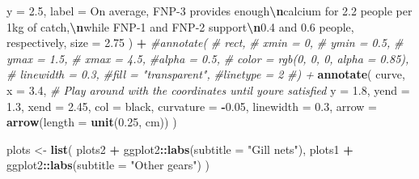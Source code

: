\documentclass[
]{book}
\newenvironment{Shaded}{\begin{snugshade}}{\end{snugshade}}
\newcommand{\AttributeTok}[1]{\textcolor[rgb]{0.13,0.29,0.53}{#1}}
\newcommand{\CommentTok}[1]{\textcolor[rgb]{0.56,0.35,0.01}{\textit{#1}}}
\newcommand{\FloatTok}[1]{\textcolor[rgb]{0.00,0.00,0.81}{#1}}
\newcommand{\FunctionTok}[1]{\textcolor[rgb]{0.13,0.29,0.53}{\textbf{#1}}}
\newcommand{\NormalTok}[1]{#1}
\newcommand{\OtherTok}[1]{\textcolor[rgb]{0.56,0.35,0.01}{#1}}
\newcommand{\SpecialCharTok}[1]{\textcolor[rgb]{0.81,0.36,0.00}{\textbf{#1}}}
\newcommand{\StringTok}[1]{\textcolor[rgb]{0.31,0.60,0.02}{#1}}
\begin{document}
\begin{Shaded}
\begin{Highlighting}[]
    \AttributeTok{y =} \FloatTok{2.5}\NormalTok{,}
    \AttributeTok{label =} \StringTok{\textquotesingle{}On average, FNP{-}3 provides enough}\SpecialCharTok{\textbackslash{}n}\StringTok{calcium for 2.2 people per 1kg of catch,}\SpecialCharTok{\textbackslash{}n}\StringTok{while FNP{-}1 and FNP{-}2 support}\SpecialCharTok{\textbackslash{}n}\StringTok{0.4 and 0.6 people, respectively\textquotesingle{}}\NormalTok{,}
    \AttributeTok{size =} \FloatTok{2.75}
\NormalTok{  ) }\SpecialCharTok{+}
  \CommentTok{\#annotate(}
  \CommentTok{\#  \textquotesingle{}rect\textquotesingle{},}
  \CommentTok{\#  xmin = 0,}
  \CommentTok{\#  ymin = 0.5,}
  \CommentTok{\#  ymax = 1.5,}
  \CommentTok{\#  xmax = 4.5,}
    \CommentTok{\#alpha = 0.5,}
  \CommentTok{\#  color = rgb(0, 0, 0, alpha = 0.85),}
   \CommentTok{\# linewidth = 0.3,}
    \CommentTok{\#fill = "transparent",}
    \CommentTok{\#linetype = 2}
  \CommentTok{\#) +}
  \FunctionTok{annotate}\NormalTok{(}
    \StringTok{\textquotesingle{}curve\textquotesingle{}}\NormalTok{,}
    \AttributeTok{x =} \FloatTok{3.4}\NormalTok{, }\CommentTok{\# Play around with the coordinates until you\textquotesingle{}re satisfied}
    \AttributeTok{y =} \FloatTok{1.8}\NormalTok{,}
    \AttributeTok{yend =} \FloatTok{1.3}\NormalTok{,}
    \AttributeTok{xend =} \FloatTok{2.45}\NormalTok{,}
    \AttributeTok{col =} \StringTok{\textquotesingle{}black\textquotesingle{}}\NormalTok{,}
    \AttributeTok{curvature =} \SpecialCharTok{{-}}\FloatTok{0.05}\NormalTok{,}
    \AttributeTok{linewidth =} \FloatTok{0.3}\NormalTok{,}
    \AttributeTok{arrow =} \FunctionTok{arrow}\NormalTok{(}\AttributeTok{length =} \FunctionTok{unit}\NormalTok{(}\FloatTok{0.25}\NormalTok{, }\StringTok{\textquotesingle{}cm\textquotesingle{}}\NormalTok{))}
\NormalTok{  )}


\NormalTok{plots }\OtherTok{\textless{}{-}}
  \FunctionTok{list}\NormalTok{(}
\NormalTok{    plots2 }\SpecialCharTok{+}\NormalTok{ ggplot2}\SpecialCharTok{::}\FunctionTok{labs}\NormalTok{(}\AttributeTok{subtitle =} \StringTok{"Gill nets"}\NormalTok{),}
\NormalTok{    plots1 }\SpecialCharTok{+}\NormalTok{ ggplot2}\SpecialCharTok{::}\FunctionTok{labs}\NormalTok{(}\AttributeTok{subtitle =} \StringTok{"Other gears"}\NormalTok{)}
\NormalTok{  )}


\end{Highlighting}
\end{Shaded}
\end{document}
